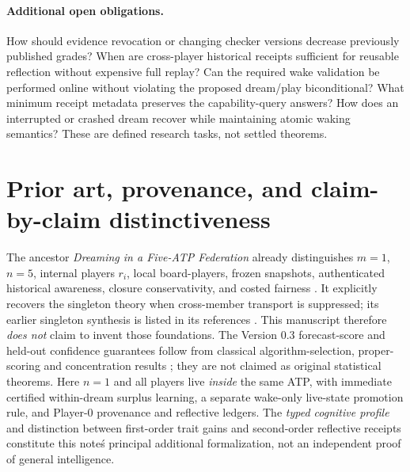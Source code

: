 \documentclass[11pt,letterpaper]{article}
\theoremstyle{definition}
\theoremstyle{plain}
\theoremstyle{definition}
\begin{document}
\paragraph{Additional open obligations.} How should evidence revocation or changing checker versions decrease previously published grades? When are cross-player historical receipts sufficient for reusable reflection without expensive full replay? Can the required wake validation be performed online without violating the proposed dream/play biconditional? What minimum receipt metadata preserves the capability-query answers? How does an interrupted or crashed dream recover while maintaining atomic waking semantics? These are defined research tasks, not settled theorems.

\section{Prior art, provenance, and claim-by-claim distinctiveness}\label{gl-first-W0-s18}
The ancestor \emph{Dreaming in a Five-ATP Federation} already distinguishes $m=1$, $n=5$, internal players $r_i$, local board-players, frozen snapshots, authenticated historical awareness, closure conservativity, and costed fairness \cite{tenneson-five}. It explicitly recovers the singleton theory when cross-member transport is suppressed; its earlier singleton synthesis is listed in its references \cite{tenneson-singleton}. This manuscript therefore \emph{does not} claim to invent those foundations. The Version 0.3 forecast-score and held-out confidence guarantees follow from classical algorithm-selection, proper-scoring and concentration results \cite{satzilla,brier,hoeffding,dwork}; they are not claimed as original statistical theorems. Here $n=1$ and all players live \emph{inside} the same ATP, with immediate certified within-dream surplus learning, a separate wake-only live-state promotion rule, and Player-0 provenance and reflective ledgers. The \emph{typed cognitive profile} and distinction between first-order trait gains and second-order reflective receipts constitute this note\'s principal additional formalization, not an independent proof of general intelligence.
\end{document}
